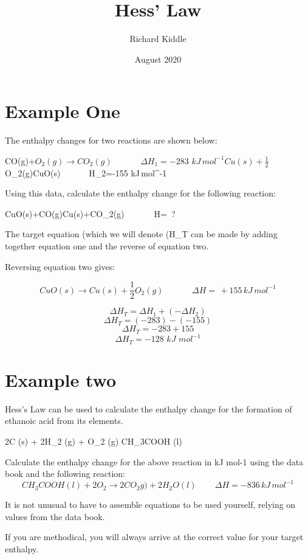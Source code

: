 \documentclass{article}
\title{Hess' Law}
\author{Richard Kiddle }
\date{August 2020}
\begin{document}
\maketitle
\section{Example One}
The enthalpy changes for two reactions are shown below:

CO(g)+$O_{2}(g)\rightarrow CO_{2}(g)\,\,\,\,\,\,\,\,\,\,\,\,\,\,\,\,\,\,\,\,\Delta H_{1}=-283\,\,kJ\,mol^{-1}

Cu(s)+\frac{1}{2}$O_{2}(g)\rightarrow CuO(s)\,\,\,\,\,\,\,\,\,\,\,\,\,\,\,\,\,\,\,\,\Delta H_{2}=-155\,\,kJ\,mol^{-1}

Using this data, calculate the enthalpy change for the following reaction:

CuO(s)+CO(g)\rightarrow Cu(s)+CO_{2}(g)\,\,\,\,\,\,\,\,\,\,\,\,\,\,\,\,\,\,\,\,\,\Delta H=\, ?\

The target equation (which we will denote (\Delta H_{T}\) can be made by adding together equation one and the reverse of equation two.

Reversing equation two gives:

$$CuO(s)\rightarrow Cu(s)+\frac{1}{2}O_{2}(g)\,\,\,\,\,\,\,\,\,\,\,\,\,\,\,\,\,\,\,\,\Delta H=\,+155\,kJ\,mol^{-1}$$

$$\Delta H_{T}=\Delta H_{1}+(-\Delta  H_{2})$$
$$\Delta H_{T}= (-283)-(-155)$$
$$\Delta H_{T}= -283 +155$$
$$\Delta H_{T}= -128\,\,kJ\,\,mol^{-1}$$

\section{Example two}

Hess’s Law can be used to calculate the enthalpy change for the formation of ethanoic acid from its elements.

2C (s)  +  2H_{2} (g)  +  O_{2} (g)  \rightarrow   CH_{3}COOH (l)

Calculate the enthalpy change for the above reaction in kJ mol-1 using the data book and the following reaction:
$$CH_{3}COOH(l)+2O_{2}\rightarrow 2CO_{2}g)+2H_{2}O(l)\,\,\,\,\,\,\,\,\,\,\,\,\,\Delta H=-836\,kJ\,mol^{-1}$$

It is not unusual to have to assemble equations to be used yourself, relying on values from the data book.

If you are methodical, you will always arrive at the correct value for your target enthalpy.
\end{document}
